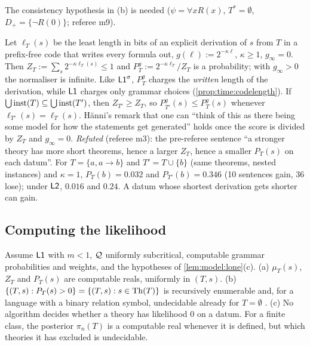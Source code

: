 The consistency hypothesis in (b) is needed ($\psi=\forall xR(x)$, $T^*=\emptyset$, $D_+=\{\neg R(0)\}$; referee m9).

\begin{remark}\label{rem:model:graded}
Let $\ell_T(s)$ be the least length in bits of an explicit derivation of $s$ from $T$ in a prefix-free code that writes every formula out, $g(\ell):=2^{-\kappa\ell}$, $\kappa\ge1$, $g_\infty=0$. Then $Z_T:=\sum_s2^{-\kappa\ell_T(s)}\le1$ and $P^g_T:=2^{-\kappa\ell_T}/Z_T$ is a probability; with $g_\infty>0$ the normaliser is infinite. Like $\mathord{\mathsf{L1}}^{\sigma}$, $P^g_T$ charges the \emph{written} length of the derivation, while $\mathord{\mathsf{L1}}$ charges only grammar choices (\cref{prop:time:codelength}). If $\bigcup\mathrm{inst}(T)\subseteq\bigcup\mathrm{inst}(T')$, then $Z_{T'}\ge Z_T$, so $P^g_{T'}(s)\le P^g_T(s)$ whenever $\ell_{T'}(s)=\ell_T(s)$. H\"anni's remark that one can ``think of this as there being some model for how the statements get generated'' holds once the score is divided by $Z_T$ and $g_\infty=0$.
\emph{Refuted} (referee m3): the pre-referee sentence ``a stronger theory has more short theorems, hence a larger $Z_T$, hence a smaller $P_T(s)$ on each datum''. For $T=\{a,a\to b\}$ and $T'=T\cup\{b\}$ (same theorems, nested instances) and $\kappa=1$, $P_T(b)=0.032$ and $P_{T'}(b)=0.346$ (10 sentences gain, 36 lose); under $\mathord{\mathsf{L2}}$, $0.016$ and $0.24$. A datum whose shortest derivation gets shorter can gain.
\end{remark}

\subsection{Computing the likelihood}\label{sec:model:compute}

\begin{proposition}\label{prop:model:compute}
Assume $\mathord{\mathsf{L1}}$ with $m<1$, $\mathcal{Q}$ uniformly subcritical, computable grammar probabilities and weights, and the hypotheses of \cref{lem:model:lone}(c).
(a) $\mu_T(s)$, $Z_T$ and $P_T(s)$ are computable reals, uniformly in $(T,s)$.
(b) $\{(T,s):P_T(s)>0\}=\{(T,s):s\in\mathrm{Th}(T)\}$ is recursively enumerable and, for a language with a binary relation symbol, undecidable already for $T=\emptyset$ \citep{church1936note,turing1936computable}.
(c) No algorithm decides whether a theory has likelihood $0$ on a datum. For a finite class, the posterior $\pi_n(T)$ is a computable real whenever it is defined, but which theories it has excluded is undecidable.
\end{proposition}

